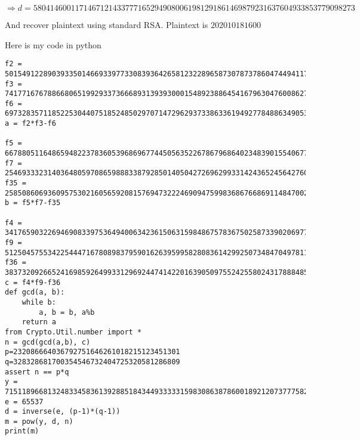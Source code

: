 \documentclass[letterpaper]{article}
\begin{document}
$\Rightarrow d=58041460011714671214337771652949080061981291861469879231637604933853779098273$

And recover plaintext using standard RSA. Plaintext is $202010181600$

Here is my code in python

\begin{verbatim}
f2 = 50154912289039335014669339773308393642658123228965873078737860474494117389068
f3 = 74177167678866806519929337366689313939300015489238864541679630476008627210599
f6 = 69732835711852253044075185248502970714729629373386336194927784886349053828079
a = f2*f3-f6

f5 = 66788051164865948223783605396869677445056352267867968640234839015540677264876
f7 = 25469333231403648059708659888338792850140504272696299331424365245642760908571
f35 = 25850860693609575302160565920815769473222469094759983686766869114847002714718
b = f5*f7-f35

f4 = 34176590322694690833975364940063423615063159848675783675025873390206977645476
f9 = 51250457553422544471678089837959016263959958280836142992507348470497811391846
f36 = 38373209266524169859264993312969244741422016390509755242558024317888485094728
c = f4*f9-f36
def gcd(a, b):
    while b:
        a, b = b, a%b
    return a
from Crypto.Util.number import *
n = gcd(gcd(a,b), c)
p=232086664036792751646261018215123451301
q=328328681700354546732404725320581286809
assert n == p*q
y = 71511896681324833458361392885184344933333159830863878600189212073777582178173
e = 65537
d = inverse(e, (p-1)*(q-1))
m = pow(y, d, n)
print(m)
\end{verbatim}
\end{document}

